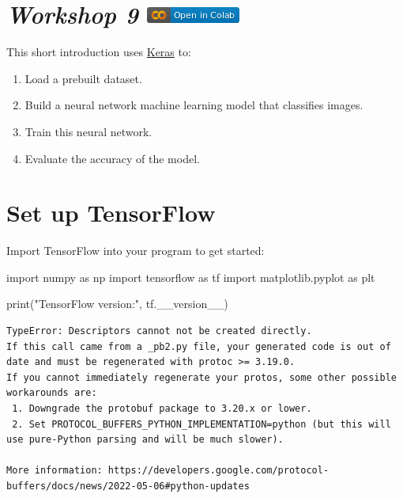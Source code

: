 \documentclass[
  letterpaper,
  DIV=11,
  numbers=noendperiod]{scrreprt}
\newenvironment{Shaded}{\begin{snugshade}}{\end{snugshade}}
\newcommand{\BuiltInTok}[1]{\textcolor[rgb]{0.00,0.23,0.31}{#1}}
\newcommand{\ImportTok}[1]{\textcolor[rgb]{0.00,0.46,0.62}{#1}}
\newcommand{\NormalTok}[1]{\textcolor[rgb]{0.00,0.23,0.31}{#1}}
\newcommand{\StringTok}[1]{\textcolor[rgb]{0.13,0.47,0.30}{#1}}
\providecommand{\tightlist}{%
  \setlength{\itemsep}{0pt}\setlength{\parskip}{0pt}}\usepackage{longtable,booktabs,array}
\begin{document}
\hypertarget{workshop-9-open-in-colab}{%
\section[\emph{Workshop 9} ]{\texorpdfstring{\emph{Workshop 9}
\href{https://colab.research.google.com/github/oballinger/QM2/blob/main/notebooks/W09.\%20Machine\%20Learning.ipynb}{\protect\includegraphics{notebooks/../colab-badge.png}}}{Workshop 9 Open In Colab}}\label{workshop-9-open-in-colab}}

This short introduction uses
\href{https://www.tensorflow.org/guide/keras/overview}{Keras} to:

\begin{enumerate}
\def\labelenumi{\arabic{enumi}.}
\tightlist
\item
  Load a prebuilt dataset.
\item
  Build a neural network machine learning model that classifies images.
\item
  Train this neural network.
\item
  Evaluate the accuracy of the model.
\end{enumerate}

\hypertarget{set-up-tensorflow}{%
\section{Set up TensorFlow}\label{set-up-tensorflow}}

Import TensorFlow into your program to get started:

\begin{Shaded}
\begin{Highlighting}[]
\ImportTok{import}\NormalTok{ numpy }\ImportTok{as}\NormalTok{ np}
\ImportTok{import}\NormalTok{ tensorflow }\ImportTok{as}\NormalTok{ tf}
\ImportTok{import}\NormalTok{ matplotlib.pyplot }\ImportTok{as}\NormalTok{ plt}

\BuiltInTok{print}\NormalTok{(}\StringTok{"TensorFlow version:"}\NormalTok{, tf.\_\_version\_\_)}
\end{Highlighting}
\end{Shaded}

\begin{verbatim}
TypeError: Descriptors cannot not be created directly.
If this call came from a _pb2.py file, your generated code is out of date and must be regenerated with protoc >= 3.19.0.
If you cannot immediately regenerate your protos, some other possible workarounds are:
 1. Downgrade the protobuf package to 3.20.x or lower.
 2. Set PROTOCOL_BUFFERS_PYTHON_IMPLEMENTATION=python (but this will use pure-Python parsing and will be much slower).

More information: https://developers.google.com/protocol-buffers/docs/news/2022-05-06#python-updates
\end{verbatim}
\end{document}
